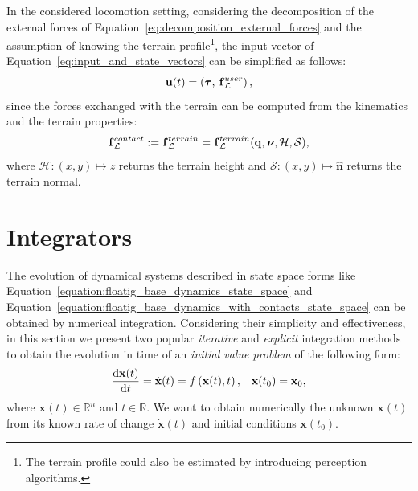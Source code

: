 In the considered locomotion setting, considering the decomposition of the external forces of Equation~\eqref{eq:decomposition_external_forces} and the assumption of knowing the terrain profile\footnote{The terrain profile could also be estimated by introducing perception algorithms.}, the input vector of Equation~\eqref{eq:input_and_state_vectors} can be simplified as follows:
%
\begin{equation*}
    \mathbf{u}(t) = \left( \boldsymbol{\tau},\, \prescript{}{}{\mathbf{f}}_\mathcal{L}^{user} \right)
    ,
\end{equation*}
%
since the forces exchanged with the terrain can be computed from the kinematics and the terrain properties:
%
\begin{equation*}
    \prescript{}{}{\mathbf{f}}_\mathcal{L}^{contact} := \prescript{}{}{\mathbf{f}}_\mathcal{L}^{terrain} = \prescript{}{}{\mathbf{f}}_\mathcal{L}^{terrain}(\mathbf{q}, \prescript{}{}{\boldsymbol{\nu}}, \mathcal{H}, \mathcal{S})
    ,
\end{equation*}
%
where $\mathcal{H}: (x, y) \mapsto z$ returns the terrain height and $\mathcal{S}: (x, y) \mapsto \hat{\mathbf{n}}$ returns the terrain normal.

\section{Integrators}
\label{sec:integrators}

The evolution of dynamical systems described in state space forms like Equation~\eqref{equation:floatig_base_dynamics_state_space} and Equation~\eqref{equation:floatig_base_dynamics_with_contacts_state_space} can be obtained by numerical integration.
Considering their simplicity and effectiveness, in this section we present two popular \emph{iterative} and \emph{explicit} integration methods to obtain the evolution in time of an \emph{initial value problem} of the following form:
%
\begin{align*}
    \dv{\mathbf{x}(t)}{t} = \dot{\mathbf{x}}(t) = f\left(\mathbf{x}(t), t\right),
    &&
    \mathbf{x}(t_0) = \mathbf{x}_0
    ,
\end{align*}
%
where $\mathbf{x}(t) \in \mathbb{R}^n$ and $t \in \mathbb{R}$.
We want to obtain numerically the unknown $\mathbf{x}(t)$ from its known rate of change $\dot{\mathbf{x}}(t)$ and initial conditions $\mathbf{x}(t_0)$.

